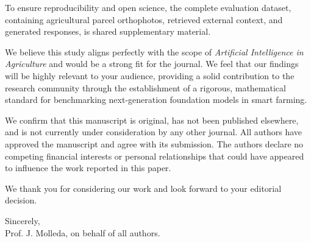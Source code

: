 \documentclass[a4paper,11pt]{letter}
\begin{document}
\vspace{1pt}
To ensure reproducibility and open science, the complete evaluation dataset, containing agricultural parcel orthophotos, retrieved external context, and generated responses, is shared supplementary material.

\vspace{1pt}
We believe this study aligns perfectly with the scope of \textit{Artificial Intelligence in Agriculture} and would be a strong fit for the journal. We feel that our findings will be highly relevant to your audience, providing a solid contribution to the research community through the establishment of a rigorous, mathematical standard for benchmarking next-generation foundation models in smart farming.

\vspace{1pt}
We confirm that this manuscript is original, has not been published elsewhere, and is not currently under consideration by any other journal. All authors have approved the manuscript and agree with its submission. The authors declare no competing financial interests or personal relationships that could have appeared to influence the work reported in this paper.


We thank you for considering our work and look forward to your editorial decision.

\bigskip
\noindent
Sincerely,\\
Prof. J. Molleda, on behalf of all authors.\\
\end{document}
